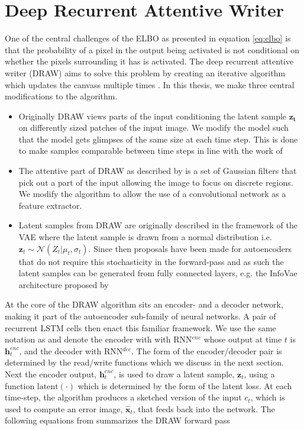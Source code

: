 \section{Deep Recurrent Attentive Writer}\label{sec:draw}

One of the central challenges of the ELBO as presented in equation \ref{eq:elbo} is that the probability of a pixel in the output being activated is not conditional on whether the pixels surrounding it has is activated. The deep recurrent attentive writer (DRAW) aims to solve this problem by creating an iterative algorithm which updates the canvass multiple times \cite{Gregor2015}. In this thesis, we make three central modifications to the algorithm. 

\begin{itemize}
\item Originally DRAW views parts of the input conditioning the latent sample $\mathbf{z_t}$ on differently sized patches of the input image. We modify the model such that the model gets glimpses of the same size at each time step. This is done to make samples comparable between time steps in line with the work of \citet{Harris2019}
\item The attentive part of DRAW as described by \citet{Gregor2015} is a set of Gaussian filters that pick out a part of the input allowing the image to focus on discrete regions. We modify the algorithm to allow the use of a convolutional network as a feature extractor.
\item Latent samples from DRAW are originally described in the framework of the VAE where the latent sample is drawn from a normal distribution i.e. $\mathbf{z}_t \sim \mathcal{N}(Z_t|\mu_t, \sigma_t)$. Since then proposals have been made for autoencoders that do not require this stochasticity in the forward-pass and as such the latent samples can be generated from fully connected layers, e.g. the InfoVae architecture proposed by \citet{Zhao}
\end{itemize}

\noindent At the core of the DRAW algorithm sits an encoder- and a decoder network, making it part of the autoencoder sub-family of neural networks. A pair of recurrent LSTM cells then enact this familiar framework. We use the same notation as \citet{Gregor2015} and denote the encoder with with RNN${}^{enc}$ whose output at time $t$ is $\mathbf{h}_t^{enc}$, and the decoder with RNN${}^{dec}$. The form of the encoder/decoder pair is determined by the read/write functions which we discuss in the next section. Next the encoder output, $\mathbf{h}_t^{enc}$, is used to draw a latent sample, $\mathbf{z}_t$, using a function $\text{latent}(\cdot)$ which is determined by the form of the latent loss. At each time-step, the algorithm produces a sketched version of the input $c_t$, which is used to compute an error image, $\hat{\mathbf{x}}_t$, that feeds back into the network. The following equations from \citet{Gregor2015} summarizes the DRAW forward pass

